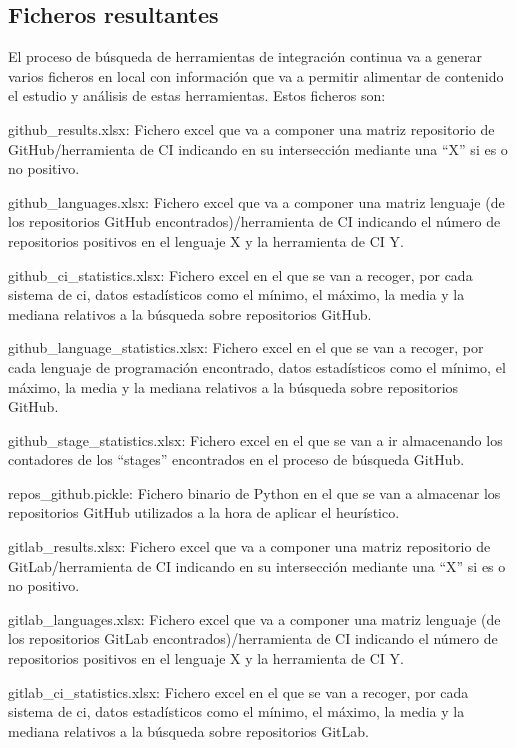 \subsection{Ficheros resultantes}
El proceso de búsqueda de herramientas de integración continua va a generar varios ficheros en local con información que va a permitir alimentar de contenido el estudio y análisis de estas herramientas. Estos ficheros son:
\begin{compactitem}
    \item github\_results.xlsx: Fichero excel que va a componer una matriz repositorio de GitHub/herramienta de CI indicando en su intersección mediante una ``X'' si es o no positivo.
    \item github\_languages.xlsx: Fichero excel que va a componer una matriz lenguaje (de los repositorios GitHub encontrados)/herramienta de CI indicando el número de repositorios positivos en el lenguaje X y la herramienta de CI Y.
    \item github\_ci\_statistics.xlsx: Fichero excel en el que se van a recoger, por cada sistema de ci, datos estadísticos como el mínimo, el máximo, la media y la mediana relativos a la búsqueda sobre repositorios GitHub.
    \item github\_language\_statistics.xlsx: Fichero excel en el que se van a recoger, por cada lenguaje de programación encontrado, datos estadísticos como el mínimo, el máximo, la media y la mediana relativos a la búsqueda sobre repositorios GitHub.
    \item github\_stage\_statistics.xlsx: Fichero excel en el que se van a ir almacenando los contadores de los ``stages'' encontrados en el proceso de búsqueda GitHub.
    \item repos\_github.pickle: Fichero binario de Python en el que se van a almacenar los repositorios GitHub utilizados a la hora de aplicar el heurístico.
    \item gitlab\_results.xlsx: Fichero excel que va a componer una matriz repositorio de GitLab/herramienta de CI indicando en su intersección mediante una ``X'' si es o no positivo.
    \item gitlab\_languages.xlsx: Fichero excel que va a componer una matriz lenguaje (de los repositorios GitLab encontrados)/herramienta de CI indicando el número de repositorios positivos en el lenguaje X y la herramienta de CI Y.
    \item gitlab\_ci\_statistics.xlsx: Fichero excel en el que se van a recoger, por cada sistema de ci, datos estadísticos como el mínimo, el máximo, la media y la mediana relativos a la búsqueda sobre repositorios GitLab.

\end{compactitem}
